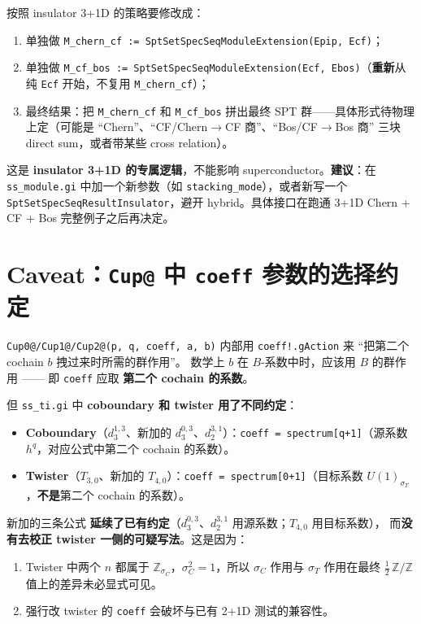 \documentclass[a4paper,fontset=ubuntu,12pt]{ctexart}
\newcommand{\ZZ}{\mathbb{Z}}
\newcommand{\aT}{\sigma_T}
\newcommand{\aC}{\sigma_C}
\begin{document}
按照 insulator 3+1D 的策略要修改成：
\begin{enumerate}
\item 单独做 \texttt{M\_chern\_cf := SptSetSpecSeqModuleExtension(Epip, Ecf)}；
\item 单独做 \texttt{M\_cf\_bos := SptSetSpecSeqModuleExtension(Ecf, Ebos)}（\textbf{重新}从纯 \texttt{Ecf} 开始，不复用 \texttt{M\_chern\_cf}）；
\item 最终结果：把 \texttt{M\_chern\_cf} 和 \texttt{M\_cf\_bos} 拼出最终 SPT 群——具体形式待物理上定（可能是 ``Chern''、``CF/Chern$\to$CF 商''、``Bos/CF$\to$Bos 商'' 三块 direct sum，或者带某些 cross relation）。
\end{enumerate}

这是 \textbf{insulator 3+1D 的专属逻辑}，不能影响 superconductor。\textbf{建议}：在 \texttt{ss\_module.gi} 中加一个新参数（如 \texttt{stacking\_mode}），或者新写一个 \texttt{SptSetSpecSeqResultInsulator}，避开 hybrid。具体接口在跑通 3+1D Chern + CF + Bos 完整例子之后再决定。

\section{Caveat：\texttt{Cup@} 中 \texttt{coeff} 参数的选择约定}
\label{sec:caveat-cup}

\texttt{Cup0@/Cup1@/Cup2@(p, q, coeff, a, b)} 内部用 \texttt{coeff!.gAction} 来 ``把第二个 cochain $b$ 拽过来时所需的群作用''。
数学上 $b$ 在 $B$-系数中时，应该用 $B$ 的群作用 —— 即 \texttt{coeff} 应取 \textbf{第二个 cochain 的系数}。

但 \texttt{ss\_ti.gi} 中 \textbf{coboundary 和 twister 用了不同约定}：

\begin{itemize}
\item \textbf{Coboundary}（$d_3^{1,3}$、新加的 $d_3^{0,3}$、$d_2^{3,1}$）：\texttt{coeff = spectrum[q+1]}（源系数 $h^q$，对应公式中第二个 cochain 的系数）。
\item \textbf{Twister}（$T_{3,0}$、新加的 $T_{4,0}$）：\texttt{coeff = spectrum[0+1]}（目标系数 $U(1)_{\aT}$，\textbf{不是}第二个 cochain 的系数）。
\end{itemize}

新加的三条公式 \textbf{延续了已有约定}（$d_3^{0,3}$、$d_2^{3,1}$ 用源系数；$T_{4,0}$ 用目标系数），
而\textbf{没有去校正 twister 一侧的可疑写法}。这是因为：
\begin{enumerate}
\item Twister 中两个 $n$ 都属于 $\ZZ_{\aC}$，$\aC^2 = 1$，所以 $\aC$ 作用与 $\aT$ 作用在最终 $\frac{1}{2}\, \mathbb{Z} / \mathbb{Z}$ 值上的差异未必显式可见。
\item 强行改 twister 的 \texttt{coeff} 会破坏与已有 2+1D 测试的兼容性。
\end{enumerate}
\end{document}
